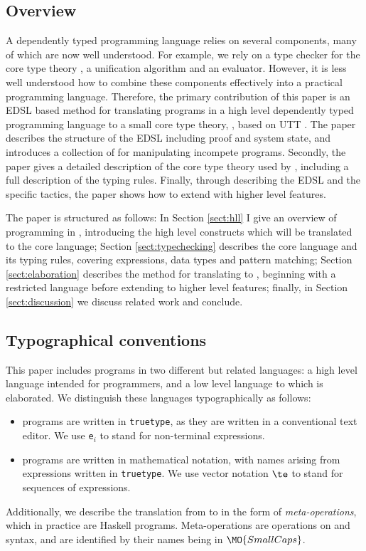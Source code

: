 \subsection{Overview}

A dependently typed programming language relies on several components, many of
which are now well understood. For example, we rely on a type checker for
the core type theory \cite{Chapman2005epigram,loh2010tutorial}, a
unification algorithm \cite{Miller1992} and an evaluator. However, it is less
well understood how to combine these components effectively into a practical
programming language. Therefore, the primary contribution of this paper is
an EDSL based method for translating programs in a
high level dependently typed programming language to a small core type theory,
\TT{}, based on UTT \cite{luo1994}. The paper describes the structure of the
EDSL including proof and system state, and introduces a collection of 
for manipulating incompete programs.
Secondly, the paper gives a detailed description of the core type theory used
by \Idris{}, including a full description of the typing rules. Finally, through
describing the EDSL and the specific tactics, the paper shows how to extend
\Idris{} with higher level features.

The paper is structured as follows: In Section \ref{sect:hll} I give an overview of
programming in \Idris{}, introducing the high level constructs which will be
translated to the core language; Section \ref{sect:typechecking} describes the
core language \TT{} and its typing rules, covering expressions, data types
and pattern matching; Section \ref{sect:elaboration} describes the method
for translating \Idris{} to \TT{}, beginning with a restricted language
\IdrisM{} before extending to higher level features; finally, in 
Section \ref{sect:discussion} we discuss related work and conclude.


\subsection{Typographical conventions}

This paper includes programs in two different but related languages: a high level
language \Idris{} intended for programmers, and a low level language \TT{} to
which \Idris{} is elaborated. We distinguish these languages typographically as
follows:

\begin{itemize}
\item \Idris{} programs are written in \texttt{truetype}, as they are written
in a conventional text editor. We use \texttt{e$_i$} to stand for non-terminal
expressions.
\item \TT{} programs are written in mathematical notation, with names arising
from \Idris{} expressions written in \texttt{truetype}. We use vector notation
$\te$ to stand for sequences of expressions.
\end{itemize}

Additionally, we describe the translation from \Idris{} to \TT{} in the form
of \emph{meta-operations}, which in practice are Haskell programs. Meta-operations
are operations on \Idris{} and \TT{} syntax, and are identified by their names being
in $\MO{SmallCaps}$.


